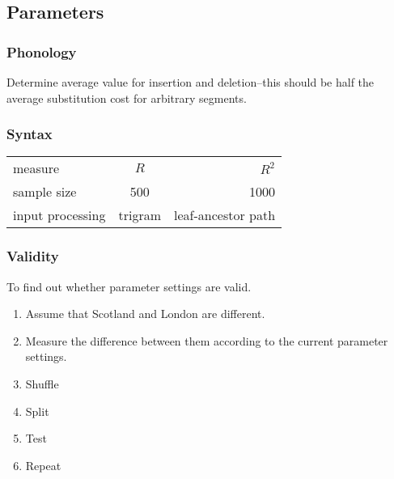 \documentclass{beamer}
\begin{document}
\subsection{Parameters}
\begin{frame}
\frametitle{Phonology}
  Determine average value for insertion and deletion--this should be
  half the average substitution cost for arbitrary segments.
\end{frame}
\begin{frame}
  \frametitle{Syntax}
  \begin{tabular}{l|cr}
  measure& $R$ & $R^2$ \\
  sample size& 500 & 1000 \\
  input processing& trigram & leaf-ancestor path \\
  \end{tabular}
\end{frame}
\begin{frame}
  \frametitle{Validity}
  To find out whether parameter settings are valid.
  \begin{enumerate}
  \item Assume that Scotland and London are different.
  \item Measure the difference between them according to the current parameter
    settings.
  \item  Shuffle
  \item Split
  \item Test
  \item Repeat
  \end{enumerate}
\end{frame}
\end{document}
